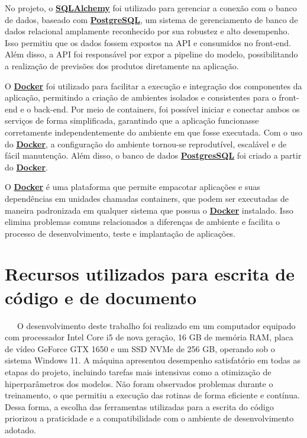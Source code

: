 \documentclass[
  12pt,
  a4paper,
]{scrreprt}
\begin{document}
No projeto, o \href{https://www.sqlalchemy.org/}{\textbf{SQLAlchemy}}
foi utilizado para gerenciar a conexão com o banco de dados, baseado com
\href{https://www.postgresql.org/}{\textbf{PostgreSQL}}, um sistema de
gerenciamento de banco de dados relacional amplamente reconhecido por
sua robustez e alto desempenho. Isso permitiu que os dados fossem
expostos na API e consumidos no front-end. Além disso, a API foi
responsável por expor a pipeline do modelo, possibilitando a realização
de previsões dos produtos diretamente na aplicação.

\vspace{12pt}

O \href{https://www.docker.com/}{\textbf{Docker}} foi utilizado para
facilitar a execução e integração dos componentes da aplicação,
permitindo a criação de ambientes isolados e consistentes para o
front-end e o back-end. Por meio de containers, foi possível iniciar e
conectar ambos os serviços de forma simplificada, garantindo que a
aplicação funcionasse corretamente independentemente do ambiente em que
fosse executada. Com o uso do
\href{https://www.docker.com/}{\textbf{Docker}}, a configuração do
ambiente tornou-se reprodutível, escalável e de fácil manutenção. Além
disso, o banco de dados
\href{https://www.postgresql.org/}{\textbf{PostgresSQL}} foi criado a
partir do \href{https://www.docker.com/}{\textbf{Docker}}.

\vspace{12pt}

O \href{https://www.docker.com/}{\textbf{Docker}} é uma plataforma que
permite empacotar aplicações e suas dependências em unidades chamadas
containers, que podem ser executadas de maneira padronizada em qualquer
sistema que possua o \href{https://www.docker.com/}{\textbf{Docker}}
instalado. Isso elimina problemas comuns relacionados a diferenças de
ambiente e facilita o processo de desenvolvimento, teste e implantação
de aplicações.

\section{Recursos utilizados para escrita de código e de
documento}\label{recursos-utilizados-para-escrita-de-cuxf3digo-e-de-documento}

~~~O desenvolvimento deste trabalho foi realizado em um computador
equipado com processador Intel Core i5 de nova geração, 16 GB de memória
RAM, placa de vídeo GeForce GTX 1650 e um SSD NVMe de 256 GB, operando
sob o sistema Windows 11. A máquina apresentou desempenho satisfatório
em todas as etapas do projeto, incluindo tarefas mais intensivas como a
otimização de hiperparâmetros dos modelos. Não foram observados
problemas durante o treinamento, o que permitiu a execução das rotinas
de forma eficiente e contínua. Dessa forma, a escolha das ferramentas
utilizadas para a escrita do código priorizou a praticidade e a
compatibilidade com o ambiente de desenvolvimento adotado.
\end{document}
